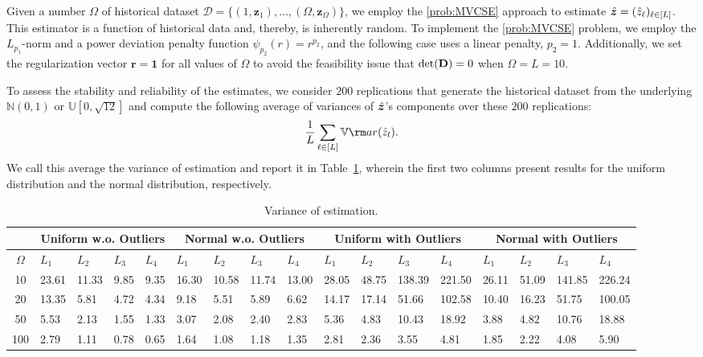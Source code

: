\documentclass[mnsc, nonblindrev]{informswp}
\newcommand{\1}[1]{\mathds{1}{\left(#1\right)}}
\begin{document}
\begin{appendices}
Given a number $\Omega$ of historical dataset $\mathcal{D} = \{(1,\bm z_1), \dots, (\Omega,\bm z_\Omega)\}$, we employ the \ref{prob:MVCSE} approach to estimate $\hat{\bm{z}} = (\hat z_\ell)_{\ell \in [L]}$. This estimator is a function of historical data and, thereby, is inherently random. To implement the \ref{prob:MVCSE} problem, we employ the $L_{p_1}$-norm and a power deviation penalty function $\psi_{p_2}(r) = r^{p_2}$, and the following case uses a linear penalty, \ie $p_2 =1$. Additionally, we set the regularization vector $\bm r = \bm 1$ for all values of $\Omega$ to avoid the feasibility issue that $\det({\mathbf{D}}) = 0$ when $\Omega = L = 10$.

To assess the stability and reliability of the estimates, we consider $200$ replications that generate the historical dataset from the underlying $\mathbb{N}(0,1)$ or $\mathbb{U}[0,\sqrt{12}]$ and compute the following average of variances of $\hat{\bm{z}}$'s components over these $200$ replications:
\[
\frac{1}{L} \sum_{\ell \in [L]} \mathbb{V}{\rm ar}(\hat{z}_l).
\]
We call this average the variance of estimation and report it in Table~\ref{tab:estimation_normal_uniform}, wherein the first two columns present results for the uniform distribution and the normal distribution, respectively. 

\begin{table}[htb]
\scriptsize
\centering
\begin{tabularx}{1.0\textwidth}
{>{\hspace{-5pt}}c<{\hspace{-3pt}}||XXXX|XXXX|XXXX|XXXX}
\hline \hline
&\multicolumn{4}{c|}{Uniform w.o. Outliers} & \multicolumn{4}{c|}{Normal w.o. Outliers} &\multicolumn{4}{c|}{Uniform with Outliers} & \multicolumn{4}{c}{Normal with Outliers}  \\
\cline{2-17}
$\Omega$ & $L_1$ & $L_{2}$ & $L_3$ & $L_{4}$ & $L_1$ & $L_{2}$ & $L_3$ & $L_{4}$ & $L_1$ & $L_{2}$ & $L_3$ & $L_{4}$ & $L_1$ & $L_{2}$ & $L_3$ & $L_{4}$   \\
\hline
10  & 23.61   & 11.33 & 9.85 & 9.35 & 16.30  & 10.58 & 11.74 & 13.00 & 28.05             & 48.75 & 138.39 & 221.50 & 26.11            & 51.09 & 141.85 & 226.24 \\
20  & 13.35   & 5.81  & 4.72 & 4.34 & 9.18   & 5.51  & 5.89  & 6.62  & 14.17             & 17.14 & 51.66  & 102.58 & 10.40            & 16.23 & 51.75  & 100.05 \\
50  & 5.53    & 2.13  & 1.55 & 1.33 & 3.07   & 2.08  & 2.40  & 2.83  & 5.36              & 4.83  & 10.43  & 18.92  & 3.88             & 4.82  & 10.76  & 18.88  \\
100 & 2.79    & 1.11  & 0.78 & 0.65 & 1.64   & 1.08  & 1.18  & 1.35  & 2.81              & 2.36  & 3.55   & 4.81   & 1.85             & 2.22  & 4.08   & 5.90   \\
\hline \hline
\end{tabularx}
\vspace{4 pt}
\caption{Variance of estimation.}
\label{tab:estimation_normal_uniform}
\end{table}


\end{appendices}
\end{document}
